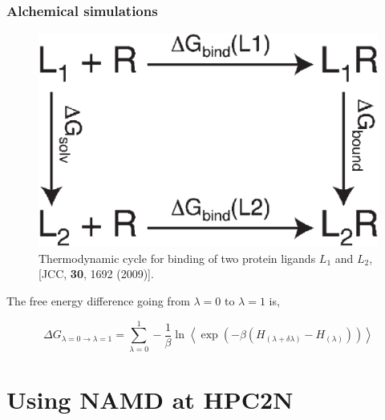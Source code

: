 \documentclass{beamer}
\begin{document}
\begin{frame}
\frametitle{Alchemical simulations}


\begin{figure}
\includegraphics[scale=0.08]{alchemical.eps}
\caption{{\scriptsize  Thermodynamic cycle for binding of two protein ligands $L_1$ and $L_2$,
[JCC, {\bf 30}, 1692 (2009)]. }}
\end{figure}

The free energy difference going from $\lambda=0$ to $\lambda=1$ is,


\begin{equation}                                                                                                                                            
	\Delta G _{\lambda=0 \rightarrow \lambda=1 } = \sum_{\lambda=0}^{1} -\frac{1}{\beta}
	\ln \left< \exp \left( -\beta (H_{(\lambda+\delta \lambda)} - H_{(\lambda)}   )   \right) \right>
\end{equation}

\end{frame}

%
% 

\section{Using NAMD at HPC2N}
\end{document}
